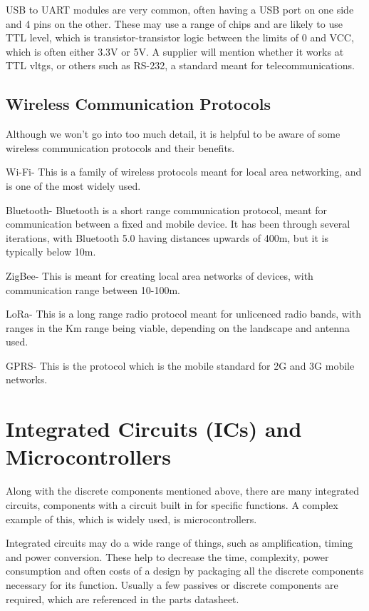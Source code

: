 \documentclass[a4paper,11pt]{report}
\begin{document}
USB to UART modules are very common, often having a USB port on one side and 4 pins on the other. These may use a range of chips and are likely to use TTL level, which is transistor-transistor logic between the limits of 0 and VCC, which is often either 3.3V or 5V. A supplier will mention whether it works at TTL \gls{vltg}s, or others such as RS-232, a standard meant for telecommunications.

\subsection{Wireless Communication Protocols}

Although we won't go into too much detail, it is helpful to be aware of some wireless communication protocols and their benefits.

Wi-Fi- This is a family of wireless protocols meant for local area networking, and is one of the most widely used.

Bluetooth- Bluetooth is a short range communication protocol, meant for communication between a fixed and mobile device. It has been through several iterations, with Bluetooth 5.0 having distances upwards of 400m, but it is typically below 10m.

ZigBee- This is meant for creating local area networks of devices, with communication range between 10-100m.

LoRa- This is a long range radio protocol meant for unlicenced radio bands, with ranges in the Km range being viable, depending on the landscape and antenna used.

GPRS- This is the protocol which is the mobile standard for 2G and 3G mobile networks.

\section{Integrated Circuits (ICs) and Microcontrollers}

Along with the discrete components mentioned above, there are many integrated circuits, components with a circuit built in for specific functions. A complex example of this, which is widely used, is microcontrollers.

Integrated circuits may do a wide range of things, such as amplification, timing and power conversion. These help to decrease the time, complexity, power consumption and often costs of a design by packaging all the discrete components necessary for its function. Usually a few passives or discrete components are required, which are referenced in the parts datasheet.
\end{document}
